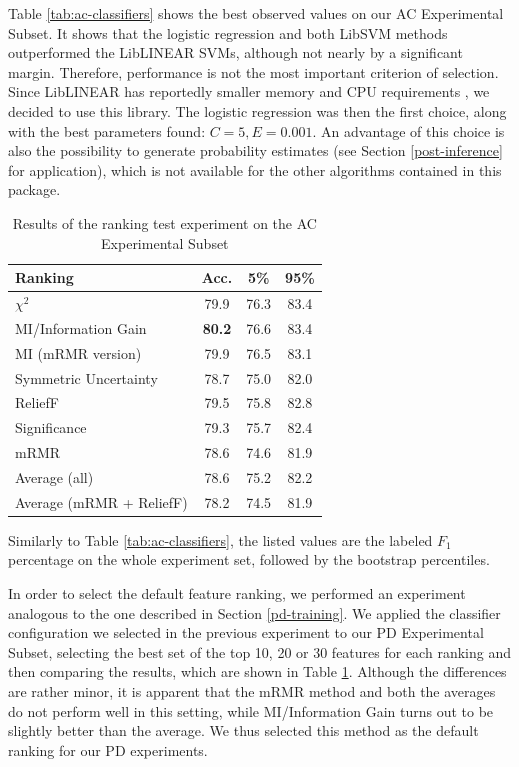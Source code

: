 \documentclass[12pt,notitlepage]{report}
\begin{document}
Table \ref{tab:ac-classifiers} shows the best observed values on our AC Experimental Subset. It shows that the logistic regression and both LibSVM methods outperformed the LibLINEAR SVMs, although not nearly by a significant margin. Therefore, performance is not the most important criterion of selection. Since LibLINEAR has reportedly smaller memory and CPU requirements \citep[our experiments were not designed to measure this, cf.][]{fan08}, we decided to use this library. The logistic regression was then the first choice, along with the best parameters found: $C = 5, E = 0.001$. An advantage of this choice is also the possibility to generate probability estimates (see Section \ref{post-inference} for application), which is not available for the other algorithms contained in this package.

\begin{table}[htb]
\caption{Results of the ranking test experiment on the AC Experimental Subset}\label{tab:ranker-pc}\footnotesize
\begin{center}
\begin{tabular}{|l|c|c|c|}\hline
\bf Ranking & \bf Acc. & \bf 5\% & \bf 95\% \\\hline
$\chi^2$ & 79.9 & 76.3 & 83.4 \\
MI/Information Gain & \bf 80.2 & 76.6 & 83.4 \\
MI (mRMR version) & 79.9 & 76.5 & 83.1 \\
Symmetric Uncertainty & 78.7 & 75.0 & 82.0 \\
ReliefF & 79.5 & 75.8 & 82.8 \\
Significance & 79.3 & 75.7 & 82.4 \\
mRMR & 78.6 & 74.6 & 81.9 \\
Average (all) & 78.6 & 75.2 & 82.2 \\
Average (mRMR + ReliefF) & 78.2 & 74.5 & 81.9 \\\hline
\end{tabular}
\end{center}
Similarly to Table \ref{tab:ac-classifiers}, the listed values are the labeled $F_1$ percentage on the whole experiment set, followed by the bootstrap percentiles.
\end{table}

In order to select the default feature ranking, we performed an experiment analogous to the one described in Section \ref{pd-training}. We applied the classifier configuration we selected in the previous experiment to our PD Experimental Subset, selecting the best set of the top 10, 20 or 30 features for each ranking and then comparing the results, which are shown in Table \ref{tab:ranker-pc}. Although the differences are rather minor, it is apparent that the mRMR method and both the averages do not perform well in this setting, while MI/Information Gain turns out to be slightly better than the average. We thus selected this method as the default ranking for our PD experiments.
\end{document}
